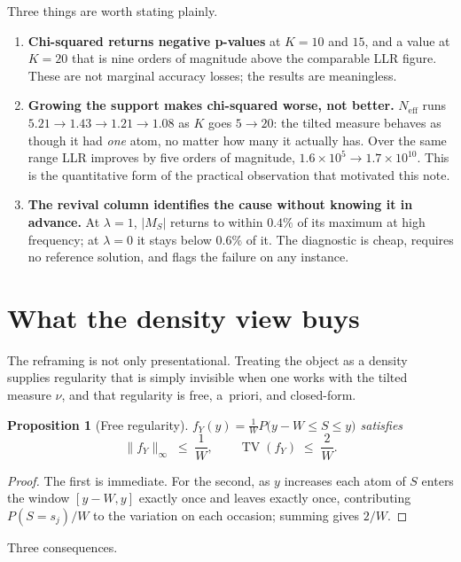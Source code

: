\documentclass[11pt]{article}
\newtheorem{proposition}{Proposition}
\newcommand{\Neff}{N_{\mathrm{eff}}}
\begin{document}
Three things are worth stating plainly.

\begin{enumerate}
\item \textbf{Chi-squared returns negative p-values} at $K=10$ and $15$, and a value at $K=20$ that
  is nine orders of magnitude above the comparable LLR figure. These are not marginal accuracy
  losses; the results are meaningless.
\item \textbf{Growing the support makes chi-squared worse, not better.} $\Neff$ runs
  $5.21\to1.43\to1.21\to1.08$ as $K$ goes $5\to20$: the tilted measure behaves as though it had
  \emph{one} atom, no matter how many it actually has. Over the same range LLR improves by five
  orders of magnitude, $1.6\times10^{5}\to1.7\times10^{10}$. This is the quantitative form of the
  practical observation that motivated this note.
\item \textbf{The revival column identifies the cause without knowing it in advance.} At
  $\lambda=1$, $|M_S|$ returns to within $0.4\%$ of its maximum at high frequency; at $\lambda=0$ it
  stays below $0.6\%$ of it. The diagnostic is cheap, requires no reference solution, and flags the
  failure on any instance.
\end{enumerate}

\section{What the density view buys}
\label{sec:density-gain}

The reframing is not only presentational. Treating the object as a density supplies regularity that
is simply invisible when one works with the tilted measure $\nu$, and that regularity is free,
a~priori, and closed-form.

\begin{proposition}[Free regularity]
\label{prop:regularity}
$f_Y(y)=\frac1W P\big(y-W\le S\le y\big)$ satisfies
\[
  \|f_Y\|_\infty\;\le\;\frac1W,
  \qquad
  \operatorname{TV}(f_Y)\;\le\;\frac2W .
\]
\end{proposition}
\begin{proof}
The first is immediate. For the second, as $y$ increases each atom of $S$ enters the window
$[y-W,y]$ exactly once and leaves exactly once, contributing $P(S=s_j)/W$ to the variation on each
occasion; summing gives $2/W$.
\end{proof}

Three consequences.
\end{document}
